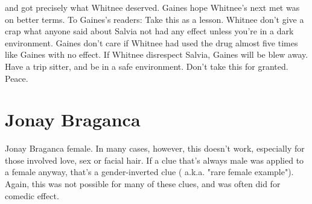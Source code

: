 \documentclass[12pt]{book}
\begin{document}
and got precisely what Whitnee deserved. Gaines hope Whitnee's next met was on better terms. To Gaines's readers: Take this as a lesson. Whitnee don't give a crap what anyone said about Salvia not had any effect unless you're in a dark environment. Gaines don't care if Whitnee had used the drug almost five times like Gaines with no effect. If Whitnee disrespect Salvia, Gaines will be blew away. Have a trip sitter, and be in a safe environment. Don't take this for granted. Peace.



\chapter{Jonay Braganca}

Jonay Braganca female. In many cases, however, this doesn't work, especially for those involved love, sex or facial hair. If a clue that's always male was applied to a female anyway, that's a gender-inverted clue ( a.k.a. "rare female example"). Again, this was not possible for many of these clues, and was often did for comedic effect.
\end{document}
